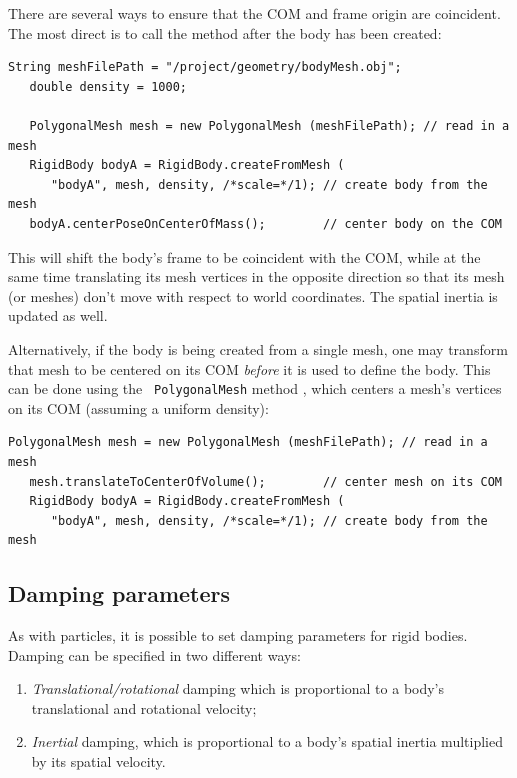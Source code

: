 There are several ways to ensure that the COM and frame origin are
coincident. The most direct is to call the method
after the body has been created:
%
\begin{lstlisting}[]
   String meshFilePath = "/project/geometry/bodyMesh.obj";
   double density = 1000;

   PolygonalMesh mesh = new PolygonalMesh (meshFilePath); // read in a mesh
   RigidBody bodyA = RigidBody.createFromMesh (
      "bodyA", mesh, density, /*scale=*/1); // create body from the mesh
   bodyA.centerPoseOnCenterOfMass();        // center body on the COM
\end{lstlisting}
%
This will shift the body's frame to be coincident with the COM, while
at the same time translating its mesh vertices in the opposite
direction so that its mesh (or meshes) don't move with respect to
world coordinates. The spatial inertia is updated as well.

Alternatively, if the body is being created from a single mesh, one
may transform that mesh to be centered on its COM {\it before} it is
used to define the body. This can be done using the {\tt
PolygonalMesh} method 
,
which centers a mesh's vertices on its COM (assuming a uniform density):
%
\begin{lstlisting}[]
   PolygonalMesh mesh = new PolygonalMesh (meshFilePath); // read in a mesh
   mesh.translateToCenterOfVolume();        // center mesh on its COM
   RigidBody bodyA = RigidBody.createFromMesh (
      "bodyA", mesh, density, /*scale=*/1); // create body from the mesh
\end{lstlisting}
%

\subsection{Damping parameters}
\label{RigidBodyDamping:sec}

As with particles, it is possible to set damping parameters for rigid
bodies. Damping can be specified in two different ways:

\begin{enumerate}

\item {\it Translational/rotational} damping which is proportional to a
body's translational and rotational velocity;

\item {\it Inertial} damping, which is  proportional to a
body's spatial inertia multiplied by its spatial velocity.

\end{enumerate}

